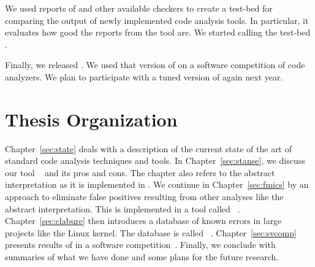 We used reports of \stan and other available checkers to create a test-bed for
comparing the output of newly implemented code analysis tools. In particular,
it evaluates how good the reports from the tool are.  We started calling the
test-bed \cdb.

Finally, we released \symbio. We used that version of \symbio on a software
competition of code analyzers. We plan to participate with a tuned version of
\symbio again next year.

\section{Thesis Organization}
Chapter~\ref{sec:state} deals with a description of the current state of the
art of standard code analysis techniques and tools. In
Chapter~\ref{sec:stanse}, we discuss our tool \stan~\cite{stanse} and its pros
and cons. The chapter also refers to the abstract interpretation as it is
implemented in \stan.  We continue in Chapter~\ref{sec:fmics} by an approach
to eliminate false positives resulting from other analyses like the abstract
interpretation. This is implemented in a tool called \symbio~\cite{symbiotic}.
Chapter~\ref{sec:clabure} then introduces a database of known errors in large
projects like the Linux kernel.  The database is called \cdb~\cite{claburedb}.
Chapter~\ref{sec:svcomp} presents results of \symbio in a software
competition~\cite{symbiotic-svcomp}.  Finally, we conclude with summaries of
what we have done and some plans for the future research.

